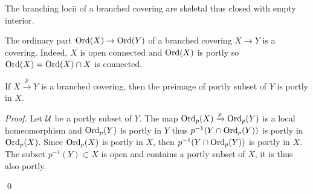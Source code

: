  \begin{rem} The branching locii of a branched covering are skeletal thus closed with empty interior.
 \end{rem}
\begin{rem}
 The ordinary part $\mathrm{Ord}(X)\rightarrow \mathrm{Ord}(Y)$ of a branched covering $X\rightarrow Y$ is a covering. Indeed, $X$ is open connected and $\mathrm{Ord}(X)$ is portly so $\mathrm{Ord}(X)=\mathrm{Ord}(X)\cap X$ is connected. 
\end{rem}
\begin{lem}\label{lem:portly_preimage_branched} If $X\xrightarrow{p} Y$ is a branched covering, then the preimage of  portly subset of $Y$ is portly in $X$.
\end{lem}
\begin{proof} Let $\mathcal{U}$ be a portly subset of $Y$.
The map $\mathrm{Ord}_p(X) \xrightarrow{p} \mathrm{Ord}_p(Y)$ is a local homeomorphism  and $\mathrm{Ord}_p(Y)$ is portly in $Y$ thus $p^{-1}(Y\cap \mathrm{Ord}_p(Y))$ is portly in $\mathrm{Ord}_p(X)$. Since $\mathrm{Ord}_p(X)$ is portly in $X$, then $p^{-1}(Y\cap \mathrm{Ord}_p(Y))$ is portly in $X$. 
The subset $p^{-1}(Y)\subset X$ is open and contains a portly subset of $X$, it is thus also portly.
 
\qed\end{proof}



